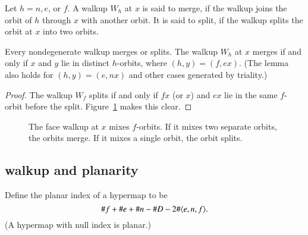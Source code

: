 \begin{definition} Let $h=n,e$, or $f$.
A walkup $W_h$ at $x$ is said to merge,
if the walkup joins the orbit of $h$ through $x$ with another orbit.  
It is said to split, if the walkup splits the
orbit at $x$ into two orbits.
\end{definition}

\begin{lemma} 
Every nondegenerate walkup merges or splits.
The walkup $W_h$ at $x$ merges if and only if $x$ and $y$  lie
in distinct $h$-orbits, where $(h,y)=(f,e x)$.  
(The lemma also holds for $(h,y)=(e,n x)$ and other cases generated
by triality.)
\end{lemma}

\begin{proof} The walkup $W_f$ splits if and only if $f x$ 
(or $x$)
and $e x$ lie in the same $f$-orbit before the split. 
Figure~\ref{fig:split} makes this clear.
\end{proof}


\begin{figure}[htb]
  \centering
  \caption{The face walkup at $x$ mixes $f$-orbits.  If it mixes
  two separate 
  orbits, the orbits merge.  If it mixes a single orbit, 
  the orbit splits.}
  \label{fig:split}
\end{figure}


\subsection{walkup and planarity}

\begin{definition} Define the planar index of a hypermap to be
$$\# f + \# e + \# n - \# D - 2\# \langle e,n,f\rangle.$$
(A hypermap with null index is planar.)
\end{definition}

